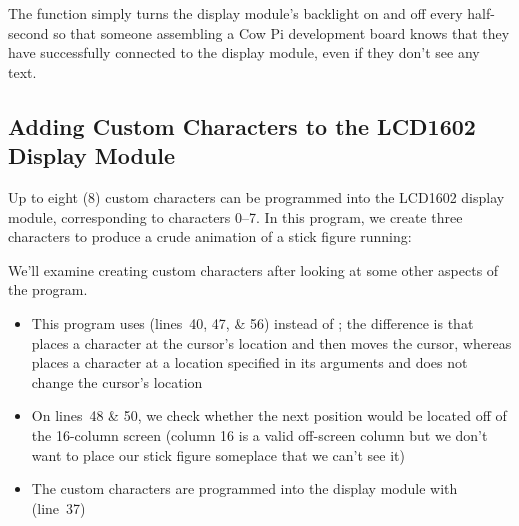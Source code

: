 {    The  function simply turns the display module's backlight on and off every half-second so that someone assembling a Cow Pi development board knows that they have successfully connected to the display module, even if they don't see any text.

\subsection{Adding Custom Characters to the LCD1602 Display Module}

    Up to eight (8) custom characters can be programmed into the LCD1602 display module, corresponding to characters 0--7.
    In this program, we create three characters to produce a crude animation of a stick figure running:

    

    We'll examine creating custom characters after looking at some other aspects of the program.
    \begin{itemize}
        \item This program uses \hyperlink{function:cowpi_lcd1602_place_character}{} (lines~40, 47, \& 56) instead of ;
            the difference is that  places a character at the cursor's location and then moves the cursor, whereas  places a character at a location specified in its arguments and does not change the cursor's location
        \item On lines~48 \& 50, we check whether the next position would be located off of the 16-column screen (column 16 is a valid off-screen column but we don't want to place our stick figure someplace that we can't see it)
        \item The custom characters are programmed into the display module with \hyperlink{function:cowpi_lcd1602_create_character}{} (line~37)
    \end{itemize}

}

